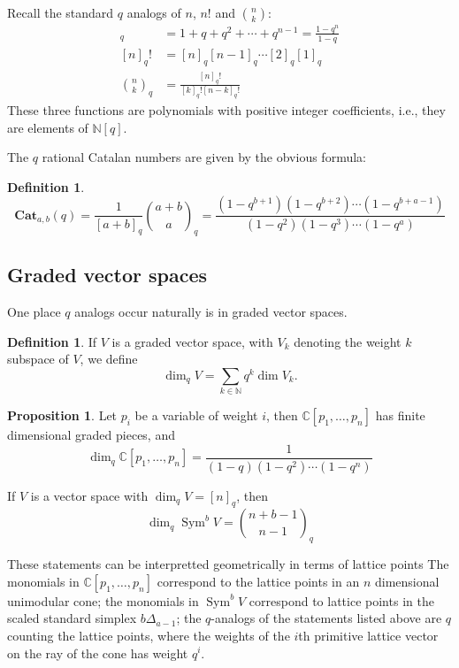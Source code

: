 \documentclass{amsart}[12pt]
\theoremstyle{definition}
\newtheorem{definition}[dummy]{Definition}
\newtheorem{proposition}[dummy]{Proposition}
\newcommand{\C}{\mathbb{C}}
\newcommand{\N}{\mathbb{N}}
\newcommand{\Cat}{\mathbf{Cat}}
\DeclareMathOperator{\Sym}{Sym}
\begin{document}
Recall the standard $q$ analogs of $n$, $n!$ and $\binom{n}{k}$:
\begin{align*}
[n]_q&=1+q+q^2+\cdots+q^{n-1}=\frac{1-q^n}{1-q} \\
[n]_q!&=[n]_q[n-1]_q\cdots [2]_q[1]_q \\
\binom{n}{k}_q&=\frac{[n]_q!}{[k]_q![n-k]_q!}
\end{align*}
These three functions are polynomials with positive integer coefficients, i.e., they are elements of $\N[q]$.

The $q$ rational Catalan numbers are given by the obvious formula:
\begin{definition}
$$\Cat_{a,b}(q)=\frac{1}{[a+b]_q} \binom{a+b}{a}_q=
\frac{(1-q^{b+1})(1-q^{b+2})\cdots (1-q^{b+a-1})}{(1-q^2)(1-q^3)\cdots (1-q^a)}$$
\end{definition}


\subsection{Graded vector spaces}

One place $q$ analogs occur naturally is in graded vector spaces.
\begin{definition}
If $V$ is a graded vector space, with $V_k$ denoting the weight $k$ subspace of $V$, we define $$\dim_qV=\sum_{k\in \N} q^k\dim V_k.$$
\end{definition}

\begin{proposition}
Let $p_i$ be a variable of weight $i$, then $\C[p_1,\dots, p_n]$ has
finite dimensional graded pieces, and
$$\dim_q \C[p_1,\dots, p_n]=\frac{1}{(1-q)(1-q^2)\cdots(1-q^n)}$$

If $V$ is a vector space with $\dim_qV=[n]_q$, then
$$\dim_q \Sym^b V=\binom{n+b-1}{n-1}_q$$
\end{proposition}

These statements can be interpretted geometrically in terms of lattice
points   The monomials in $\C[p_1,\dots, p_n]$ correspond to the lattice points in an $n$ dimensional unimodular cone; the monomials in $\Sym^b V$ correspond to lattice points in the scaled standard simplex $b\Delta_{a-1}$; the $q$-analogs of the statements listed above are $q$ counting the lattice points, where the weights of the $i$th primitive lattice vector on the ray of the cone has weight $q^i$.
\end{document}
